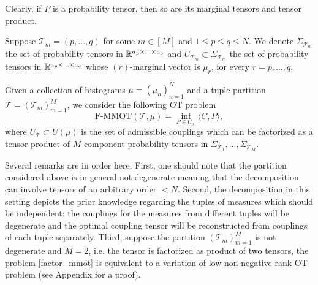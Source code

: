 Clearly, if $P$ is a probability tensor, then so are its marginal tensors and tensor product.

Suppose $\mathcal T_m = (p,...,q)$ for some $m \in [M]$ and $1 \leq p \leq q \leq N$. We denote
$\Sigma_{\mathcal T_m}$ the set of probability tensors in $\mathbb R^{a_p \times ... \times a_q}$ and
$U_{\mathcal T_m} \subset \Sigma_{\mathcal T_m}$ the set
of probability tensors in $\mathbb R^{a_p \times ... \times a_q}$ whose $(r)$-marginal vector is $\mu_r$, for every $r = p,...,q$.

\begin{definition}
  Given a collection of histograms $\mu = (\mu_n)_{n=1}^N$ and a tuple partition $\mathcal T = (\mathcal T_m)_{m=1}^M$,
  we consider the following OT problem
  \begin{equation} \label{factor_mmot}
    \text{F-MMOT}( \mathcal T, \mu) = \inf_{P \in U_{\mathcal T}} \langle C, P \rangle,
  \end{equation}
  where $U_{\mathcal T} \subset U(\mu)$ is the set of admissible couplings which can be factorized as a tensor product of $M$
  component probability tensors in $\Sigma_{\mathcal T_1}, ..., \Sigma_{\mathcal T_M}$.
\end{definition}
Several remarks are in order here. First, one should note that the partition considered above is in general not degenerate meaning
that the decomposition can involve tensors of an arbitrary order $<N$. Second, the decomposition in this setting depicts the prior
knowledge regarding the tuples of measures which should be independent: the couplings for the measures from different tuples will
be degenerate and the optimal coupling tensor will be reconstructed from couplings of each tuple separately.
Third, suppose the partition $(\mathcal T_m)_{m=1}^M$ is not degenerate and $M=2$, i.e. the tensor is factorized as product of
two tensors, the problem \cref{factor_mmot} is equivalent to a variation of low non-negative rank OT problem (see Appendix for a proof).

